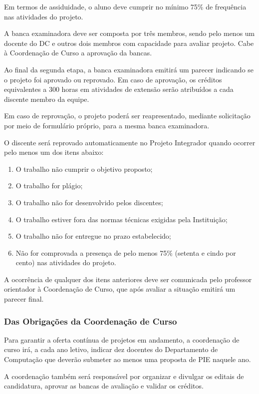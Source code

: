 Em termos de assiduidade, o aluno deve cumprir no mínimo 75\% de frequência nas atividades do projeto.

A banca examinadora deve ser composta por três membros, sendo pelo menos um docente do DC e outros dois membros com capacidade para avaliar projeto. Cabe à Coordenação de Curso a aprovação da bancas.

Ao final da segunda etapa, a banca examinadora emitirá um parecer indicando se o projeto foi aprovado ou reprovado. Em caso de aprovação, os créditos equivalentes a 300 horas em atividades de extensão serão atribuídos a cada discente membro da equipe.

Em caso de reprovação, o projeto poderá ser reapresentado, mediante solicitação por meio de formulário próprio, para a mesma banca examinadora.




O discente será reprovado automaticamente no Projeto Integrador quando
ocorrer pelo menos um dos itens abaixo:
\begin{enumerate}
    \item O trabalho não cumprir o objetivo proposto;
    \item O trabalho for plágio;
    \item O trabalho não for desenvolvido pelos discentes;
    \item O trabalho estiver fora das normas técnicas exigidas pela Instituição;
    \item O trabalho não for entregue no prazo estabelecido;
    \item Não for comprovada a presença de pelo menos 75\% (setenta e cindo por cento) nas atividades do projeto.
\end{enumerate}

A ocorrência de qualquer dos itens anteriores deve ser comunicada
pelo professor orientador à Coordenação de Curso, que após avaliar a situação emitirá um parecer final.


\subsubsection{Das Obrigações da Coordenação de Curso}

Para garantir a oferta contínua de projetos em andamento, a coordenação de curso irá, a cada ano letivo, indicar dez docentes do Departamento de Computação que deverão submeter ao menos uma proposta de PIE naquele ano.

A coordenação também será responsável por organizar e divulgar os editais de candidatura, aprovar as bancas de avaliação e validar os créditos.